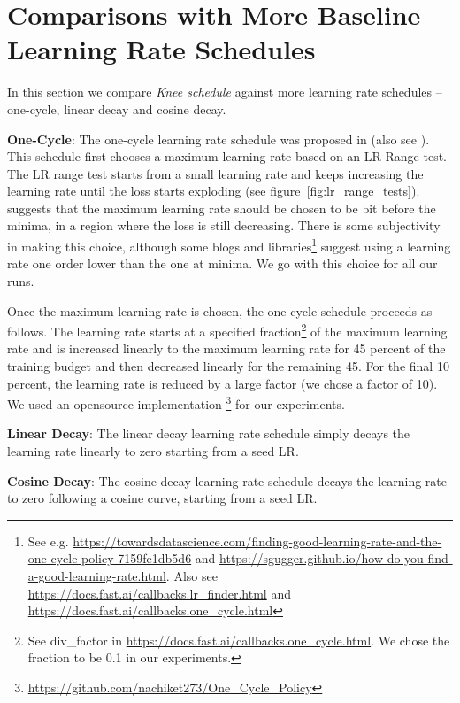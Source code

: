 \documentclass{article} \usepackage{iclr2021_conference,times}
\newcommand{\lrschedule}{\textit{Knee schedule}}
\begin{document}
 \section{Comparisons with More Baseline Learning Rate Schedules}
\label{sec:extra_baselines}

In this section we compare \lrschedule{} against more learning rate schedules -- one-cycle, linear decay and cosine decay.

\textbf{One-Cycle}: The one-cycle learning rate schedule was proposed in \cite{smith2018disciplined_onecycle} (also see \cite{smith2017cyclical}). This schedule first chooses a maximum learning rate based on an LR Range test. The LR range test starts from a small learning rate and keeps increasing the learning rate until the loss starts exploding (see figure~\ref{fig:lr_range_tests}). \cite{smith2018disciplined_onecycle} suggests that the maximum learning rate should be chosen to be bit before the minima, in a region where the loss is still decreasing. There is some subjectivity in making this choice, although some blogs and libraries\footnote{See e.g. \url{https://towardsdatascience.com/finding-good-learning-rate-and-the-one-cycle-policy-7159fe1db5d6} and \url{https://sgugger.github.io/how-do-you-find-a-good-learning-rate.html}. Also see \url{https://docs.fast.ai/callbacks.lr_finder.html} and \url{https://docs.fast.ai/callbacks.one_cycle.html}} suggest using a learning rate one order lower than the one at minima. We go with this choice for all our runs.

Once the maximum learning rate is chosen, the one-cycle schedule proceeds as follows. The learning rate starts at a specified fraction\footnote{See div\_factor in \url{https://docs.fast.ai/callbacks.one_cycle.html}. We chose the fraction to be 0.1 in our experiments.} of the maximum learning rate and is increased linearly to the maximum learning rate for 45 percent of the training budget and then decreased linearly for the remaining 45. For the final 10 percent, the learning rate is reduced by a large factor (we chose a factor of 10).  We used an opensource implementation \footnote{\url{https://github.com/nachiket273/One_Cycle_Policy} } for our experiments.

\textbf{Linear Decay}: The linear decay learning rate schedule simply decays the learning rate linearly to zero starting from a seed LR.

\textbf{Cosine Decay}: The cosine decay learning rate schedule decays the learning rate to zero following a cosine curve, starting from a seed LR.
\end{document}
